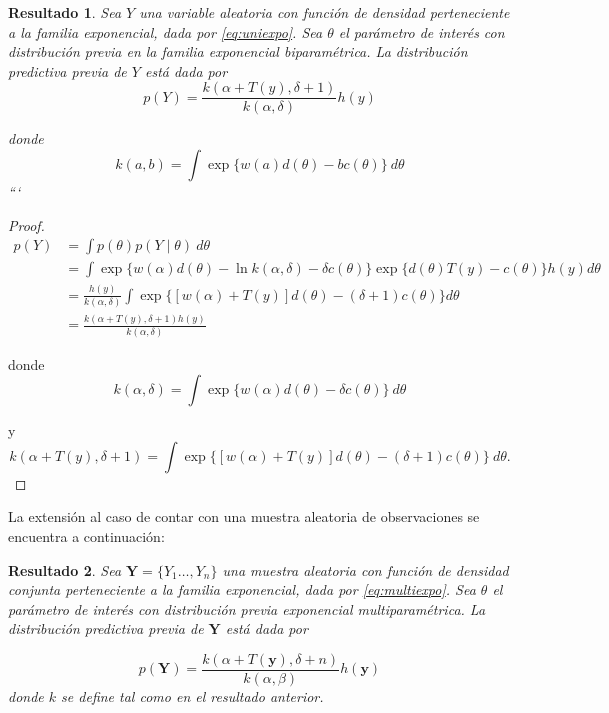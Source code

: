 \documentclass[
  spanish,
]{book}
\newtheorem{proposition}{Resultado}[chapter]
\theoremstyle{definition}
\theoremstyle{definition}
\theoremstyle{definition}
\theoremstyle{remark}
\begin{document}
\begin{proposition}
\protect\hypertarget{prp:unnamed-chunk-9}{}{\label{prp:unnamed-chunk-9} }Sea \(Y\) una variable aleatoria con función de densidad perteneciente a la familia exponencial, dada por \eqref{eq:uniexpo}. Sea \(\theta\) el parámetro de interés con distribución previa en la familia exponencial biparamétrica. La distribución predictiva previa de \(Y\) está dada por
\begin{equation}
p(Y)=\frac{k(\alpha+T(y),\delta+1)}{k(\alpha,\delta)}h(y)
\end{equation}

donde
\begin{equation*}
k(a,b)=\int \exp\{w(a) d(\theta)-b c(\theta)\}\ d\theta
\end{equation*}
```
\end{proposition}
\begin{proof}
\iffalse{} {Prueba. } \fi{}\begin{align*}
p(Y)&=\int p(\theta)p(Y \mid \theta)\ d\theta\\
&=\int \exp\{w(\alpha) d(\theta)-\ln k(\alpha,\delta)-\delta c(\theta)\}\exp\{d(\theta)T(y)-c(\theta)\}h(y)d\theta\\
&=\frac{h(y)}{k(\alpha,\delta)}\int \exp\{[w(\alpha)+T(y)]d(\theta)-(\delta+1)c(\theta)\}d\theta\\
&=\frac{k(\alpha+T(y),\delta+1)h(y)}{k(\alpha,\delta)}
\end{align*}

donde
\begin{equation*}
k(\alpha,\delta)=\int \exp\{w(\alpha) d(\theta)-\delta c(\theta)\}\ d\theta
\end{equation*}

y
\begin{equation*}
k(\alpha+T(y),\delta+1)=\int \exp\{[w(\alpha)+T(y)]d(\theta)-(\delta+1)c(\theta)\} \ d\theta.
\end{equation*}
\end{proof}

La extensión al caso de contar con una muestra aleatoria de
observaciones se encuentra a continuación:

\begin{proposition}
\protect\hypertarget{prp:unnamed-chunk-11}{}{\label{prp:unnamed-chunk-11} }Sea \(\mathbf{Y}=\{Y_1\ldots,Y_n\}\) una muestra aleatoria con función de densidad conjunta perteneciente a la familia exponencial, dada por \eqref{eq:multiexpo}. Sea \(\theta\) el parámetro de interés con distribución previa exponencial multiparamétrica. La distribución predictiva previa de \(\mathbf{Y}\) está dada por

\begin{equation}
p(\mathbf{Y})=\frac{k(\alpha+T(\mathbf{y}),\delta+n)}{k(\alpha,\beta)}h(\mathbf{y})
\end{equation}
donde \(k\) se define tal como en el resultado anterior.
\end{proposition}
\end{document}
